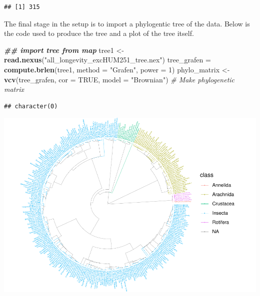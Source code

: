 \documentclass[
]{article}
\newenvironment{Shaded}{\begin{snugshade}}{\end{snugshade}}
\newcommand{\AttributeTok}[1]{\textcolor[rgb]{0.13,0.29,0.53}{#1}}
\newcommand{\CommentTok}[1]{\textcolor[rgb]{0.56,0.35,0.01}{\textit{#1}}}
\newcommand{\ConstantTok}[1]{\textcolor[rgb]{0.56,0.35,0.01}{#1}}
\newcommand{\DecValTok}[1]{\textcolor[rgb]{0.00,0.00,0.81}{#1}}
\newcommand{\DocumentationTok}[1]{\textcolor[rgb]{0.56,0.35,0.01}{\textbf{\textit{#1}}}}
\newcommand{\FunctionTok}[1]{\textcolor[rgb]{0.13,0.29,0.53}{\textbf{#1}}}
\newcommand{\NormalTok}[1]{#1}
\newcommand{\OtherTok}[1]{\textcolor[rgb]{0.56,0.35,0.01}{#1}}
\newcommand{\SpecialCharTok}[1]{\textcolor[rgb]{0.81,0.36,0.00}{\textbf{#1}}}
\newcommand{\StringTok}[1]{\textcolor[rgb]{0.31,0.60,0.02}{#1}}
\begin{document}
\begin{Shaded}
\end{Shaded}

\begin{verbatim}
## [1] 315
\end{verbatim}

\newpage

The final stage in the setup is to import a phylogentic tree of the
data. Below is the code used to produce the tree and a plot of the tree
itself.

\begin{Shaded}
\begin{Highlighting}[]
\DocumentationTok{\#\# import tree from map}
\NormalTok{tree1 }\OtherTok{\textless{}{-}} \FunctionTok{read.nexus}\NormalTok{(}\StringTok{"all\_longevity\_excHUM251\_tree.nex"}\NormalTok{)}
\NormalTok{tree\_grafen }\OtherTok{=} \FunctionTok{compute.brlen}\NormalTok{(tree1, }\AttributeTok{method =} \StringTok{"Grafen"}\NormalTok{, }\AttributeTok{power =} \DecValTok{1}\NormalTok{)}
\NormalTok{phylo\_matrix }\OtherTok{\textless{}{-}} \FunctionTok{vcv}\NormalTok{(tree\_grafen, }\AttributeTok{cor =} \ConstantTok{TRUE}\NormalTok{, }\AttributeTok{model =} \StringTok{"Brownian"}\NormalTok{)  }\CommentTok{\# Make phylogenetic matrix}
\end{Highlighting}
\end{Shaded}

\begin{verbatim}
## character(0)
\end{verbatim}

\includegraphics{meta_analysis_longevity_files/figure-latex/unnamed-chunk-6-1.pdf}
\end{document}
